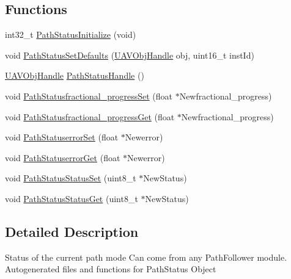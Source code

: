 \subsection*{\-Functions}
\begin{DoxyCompactItemize}
\item 
int32\-\_\-t \hyperlink{group___path_status_gaccca7c7e801ba74311222f1ec389d42b}{\-Path\-Status\-Initialize} (void)
\item 
void \hyperlink{group___path_status_ga0b9e01f677b028c6c77194efea88463a}{\-Path\-Status\-Set\-Defaults} (\hyperlink{targets_2_u_a_v_objects_2inc_2uavobjectmanager_8h_a279053e22be53ce9f895043aaeb91e3b}{\-U\-A\-V\-Obj\-Handle} obj, uint16\-\_\-t inst\-Id)
\item 
\hyperlink{targets_2_u_a_v_objects_2inc_2uavobjectmanager_8h_a279053e22be53ce9f895043aaeb91e3b}{\-U\-A\-V\-Obj\-Handle} \hyperlink{group___path_status_ga4c77ab3b7ef447758079bf5950cf363b}{\-Path\-Status\-Handle} ()
\item 
void \hyperlink{group___path_status_ga441e163d781cc6f6b9ec1cf96a05e235}{\-Path\-Statusfractional\-\_\-progress\-Set} (float $\ast$\-Newfractional\-\_\-progress)
\item 
void \hyperlink{group___path_status_ga6efcb15daaa73697e21fdd4e16c27aab}{\-Path\-Statusfractional\-\_\-progress\-Get} (float $\ast$\-Newfractional\-\_\-progress)
\item 
void \hyperlink{group___path_status_gab83b7870dd6e3017520de8c3d9e6ef94}{\-Path\-Statuserror\-Set} (float $\ast$\-Newerror)
\item 
void \hyperlink{group___path_status_ga723f497a6551f468213296bdff385c55}{\-Path\-Statuserror\-Get} (float $\ast$\-Newerror)
\item 
void \hyperlink{group___path_status_gab0b647fe9c5aa0f55458fc39db3c67b5}{\-Path\-Status\-Status\-Set} (uint8\-\_\-t $\ast$\-New\-Status)
\item 
void \hyperlink{group___path_status_ga460e9619d7b3ae770d67e2c2dede85de}{\-Path\-Status\-Status\-Get} (uint8\-\_\-t $\ast$\-New\-Status)
\end{DoxyCompactItemize}


\subsection{\-Detailed \-Description}
\-Status of the current path mode \-Can come from any \-Path\-Follower module. \-Autogenerated files and functions for \-Path\-Status \-Object 

